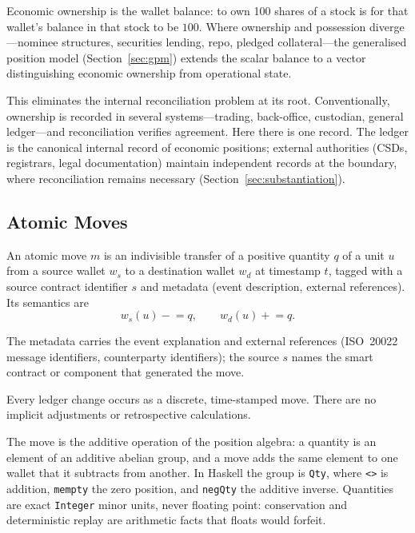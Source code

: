 \begin{principle}[Ownership]
Economic ownership is the wallet balance: to own 100 shares of a stock is for that wallet's balance in that stock to be $100$. Where ownership and possession diverge---nominee structures, securities lending, repo, pledged collateral---the generalised position model (Section~\ref{sec:gpm}) extends the scalar balance to a vector distinguishing economic ownership from operational state.
\end{principle}

This eliminates the internal reconciliation problem at its root. Conventionally, ownership is recorded in several systems---trading, back-office, custodian, general ledger---and reconciliation verifies agreement. Here there is one record. The ledger is the canonical internal record of economic positions; external authorities (CSDs, registrars, legal documentation) maintain independent records at the boundary, where reconciliation remains necessary (Section~\ref{sec:substantiation}).

\subsection{Atomic Moves}

\begin{definition}[Move]
An atomic move $m$ is an indivisible transfer of a positive quantity $q$ of a unit $u$ from a source wallet $w_s$ to a destination wallet $w_d$ at timestamp $t$, tagged with a source contract identifier $s$ and metadata (event description, external references). Its semantics are
\[
w_s(u) \mathrel{-}= q, \qquad w_d(u) \mathrel{+}= q.
\]
\end{definition}

The metadata carries the event explanation and external references (ISO~20022 message identifiers, counterparty identifiers); the source $s$ names the smart contract or component that generated the move.

\begin{principle}[Atomicity]
Every ledger change occurs as a discrete, time-stamped move. There are no implicit adjustments or retrospective calculations.
\end{principle}

The move is the additive operation of the position algebra: a quantity is an element of an additive abelian group, and a move adds the same element to one wallet that it subtracts from another. In Haskell the group is \texttt{Qty}, where \texttt{<>} is addition, \texttt{mempty} the zero position, and \texttt{negQty} the additive inverse. Quantities are exact \texttt{Integer} minor units, never floating point: conservation and deterministic replay are arithmetic facts that floats would forfeit.

